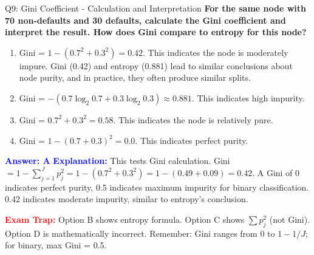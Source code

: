 \documentclass[8pt]{beamer}
\begin{document}
	\begin{frame}{Q9: Gini Coefficient - Calculation and Interpretation}
		\fontsize{6.5}{7.5}\selectfont
		\textbf{For the same node with 70 non-defaults and 30 defaults, calculate the Gini coefficient and interpret the result. How does Gini compare to entropy for this node?}
		
		\begin{enumerate}
			\item Gini = $1 - (0.7^2 + 0.3^2) = 0.42$. This indicates the node is moderately impure. Gini (0.42) and entropy (0.881) lead to similar conclusions about node purity, and in practice, they often produce similar splits.
			\item Gini = $-(0.7 \log_2 0.7 + 0.3 \log_2 0.3) \approx 0.881$. This indicates high impurity.
			\item Gini = $0.7^2 + 0.3^2 = 0.58$. This indicates the node is relatively pure.
			\item Gini = $1 - (0.7 + 0.3)^2 = 0.0$. This indicates perfect purity.
		\end{enumerate}
		
		\vspace{0.1cm}
		\textcolor{blue}{\textbf{Answer: A}}
		\vspace{0.1cm}
		\textcolor{blue}{\textbf{Explanation:}} This tests Gini calculation. Gini $= 1 - \sum_{j=1}^J p_j^2 = 1 - (0.7^2 + 0.3^2) = 1 - (0.49 + 0.09) = 0.42$. A Gini of 0 indicates perfect purity, 0.5 indicates maximum impurity for binary classification. 0.42 indicates moderate impurity, similar to entropy's conclusion.
		
		\textcolor{red}{\textbf{Exam Trap:}} Option B shows entropy formula. Option C shows $\sum p_j^2$ (not Gini). Option D is mathematically incorrect. Remember: Gini ranges from 0 to $1 - 1/J$; for binary, max Gini = 0.5.
	\end{frame}
	
\end{document}
